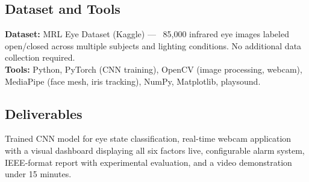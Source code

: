 \documentclass[9pt]{article}
\begin{document}
\subsection*{Dataset and Tools}
\textbf{Dataset:} MRL Eye Dataset (Kaggle) --- ~85,000 infrared eye images labeled open/closed across multiple subjects and lighting conditions. No additional data collection required.\\
\textbf{Tools:} Python, PyTorch (CNN training), OpenCV (image processing, webcam), MediaPipe (face mesh, iris tracking), NumPy, Matplotlib, playsound.

\subsection*{Deliverables}
Trained CNN model for eye state classification, real-time webcam application with a visual dashboard displaying all six factors live, configurable alarm system, IEEE-format report with experimental evaluation, and a video demonstration under 15 minutes.

\vspace{2pt}
\end{document}
